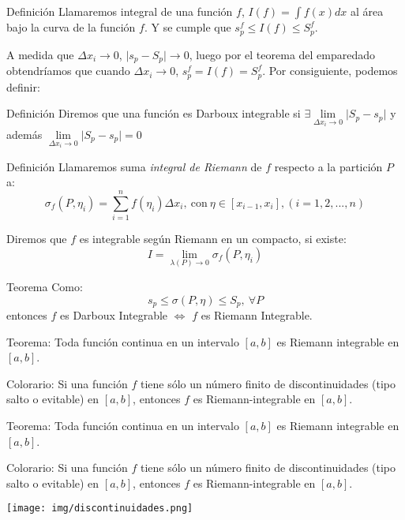 \documentclass[xcolor=table, t]{beamer}
\begin{document}
	\begin{frame}
		\ \\ \ \\
		\begin{block}{Definición}
			Llamaremos integral de una función $f$, $I(f)=\int f(x)dx$ al área bajo la curva de la función $f$. Y se cumple que $s_p^f\leq I(f)\leq S_p^f$.
		\end{block}
		\pause
		A medida que $\Delta x_i\rightarrow 0$, $\lvert s_p-S_p\rvert\rightarrow 0$, luego por el teorema del emparedado obtendríamos que cuando $\Delta x_i\rightarrow 0$, $s_p^f=I(f)=S_p^f$. Por consiguiente, podemos definir:
		\pause
		\begin{block}{Definición}
			Diremos que una función es Darboux integrable si $\exists \lim\limits_{\Delta x_i\rightarrow 0}\lvert S_p-s_p\rvert$ y además $\lim\limits_{\Delta x_i\rightarrow 0}\lvert S_p-s_p\rvert=0$
		\end{block}
	\end{frame}
	\begin{frame}
		\begin{block}{Definición}
			Llamaremos suma {\it integral de Riemann} de $f$ respecto a la partición  $P$ a:
		$$\sigma_f(P,\eta_i)=\sum_{i=1}^nf(\eta_i)\Delta x_i,\ \text{con}\ \eta\in[x_{i-1},x_i], (i=1,2,...,n)$$
		\end{block}
		\pause
		\begin{block}{}
			Diremos que $f$ es integrable según Riemann en un compacto, si existe:
		$$I=\lim_{\lambda(P)\rightarrow 0}\sigma_f(P,\eta_i)$$
		\end{block}
		\pause
		\begin{block}{Teorema}
			Como:
			$$s_p\leq \sigma(P,\eta)\leq S_p,\ \forall P$$
			entonces $f$ es Darboux Integrable $\Leftrightarrow$ $f$ es Riemann Integrable.
		\end{block}
	\end{frame}
	\begin{frame}
		\begin{block}{Teorema:}
			Toda función continua en un intervalo $[a,b]$ es Riemann integrable en $[a,b]$.	
		\end{block}
		\pause
		\begin{block}{Colorario:}
			Si una función $f$ tiene sólo un número finito de discontinuidades (tipo salto o evitable) en $[a, b]$, entonces $f$ es Riemann-integrable en $[a, b]$.			
		\end{block}
	\end{frame}
	\begin{frame}
		\begin{block}{Teorema:}
			Toda función continua en un intervalo $[a,b]$ es Riemann integrable en $[a,b]$.	
		\end{block}
		\begin{block}{Colorario:}
			Si una función $f$ tiene sólo un número finito de discontinuidades (tipo salto o evitable) en $[a, b]$, entonces $f$ es Riemann-integrable en $[a, b]$.			
		\end{block}
		\begin{center}
			\texttt{[image: img/discontinuidades.png]}
		\end{center}
	\end{frame}
\end{document}
